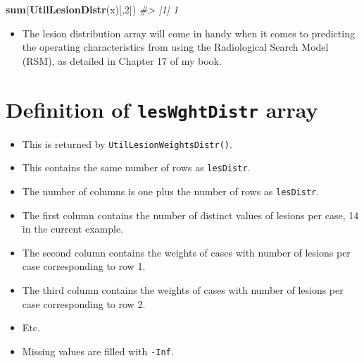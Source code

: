 \documentclass[
]{book}
\newenvironment{Shaded}{\begin{snugshade}}{\end{snugshade}}
\newcommand{\CommentTok}[1]{\textcolor[rgb]{0.56,0.35,0.01}{\textit{#1}}}
\newcommand{\DecValTok}[1]{\textcolor[rgb]{0.00,0.00,0.81}{#1}}
\newcommand{\KeywordTok}[1]{\textcolor[rgb]{0.13,0.29,0.53}{\textbf{#1}}}
\newcommand{\NormalTok}[1]{#1}
\providecommand{\tightlist}{%
  \setlength{\itemsep}{0pt}\setlength{\parskip}{0pt}}
\begin{document}
\begin{Shaded}
\begin{Highlighting}[]
\KeywordTok{sum}\NormalTok{(}\KeywordTok{UtilLesionDistr}\NormalTok{(x)[,}\DecValTok{2}\NormalTok{])}
\CommentTok{\#\textgreater{} [1] 1}
\end{Highlighting}
\end{Shaded}

\begin{itemize}
\tightlist
\item
  The lesion distribution array will come in handy when it comes to predicting the operating characteristics from using the Radiological Search Model (RSM), as detailed in Chapter 17 of my book.
\end{itemize}

\hypertarget{definition-of-leswghtdistr-array}{%
\section{\texorpdfstring{Definition of \texttt{lesWghtDistr} array}{Definition of lesWghtDistr array}}\label{definition-of-leswghtdistr-array}}

\begin{itemize}
\tightlist
\item
  This is returned by \texttt{UtilLesionWeightsDistr()}.
\item
  This contains the same number of rows as \texttt{lesDistr}.
\item
  The number of columns is one plus the number of rows as \texttt{lesDistr}.
\item
  The first column contains the number of distinct values of lesions per case, 14 in the current example.
\item
  The second column contains the weights of cases with number of lesions per case corresponding to row 1.
\item
  The third column contains the weights of cases with number of lesions per case corresponding to row 2.
\item
  Etc.
\item
  Missing values are filled with \texttt{-Inf}.
\end{itemize}
\end{document}
